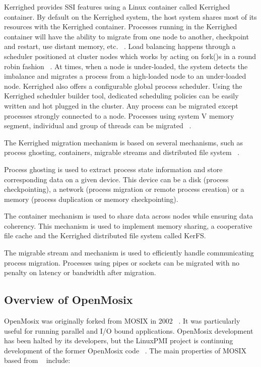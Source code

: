 \documentclass[preprint]{acm_proc_article-sp}
\begin{document}
Kerrighed provides SSI features using a Linux container called Kerrighed container. By default on the Kerrighed system, the host system shares most of its resources with the Kerrighed container. Processes running in the Kerrighed container will have the ability to migrate from one node to another, checkpoint and restart, use distant memory, etc. ~\citep{kerrighed12}. Load balancing happens through a scheduler positioned at cluster nodes which works by acting on fork()s in a round robin fashion ~\citep{kerrighed12}. At times, when a node is under-loaded, the system detects the imbalance and migrates a process from a high-loaded node to an under-loaded node. Kerrighed also offers a configurable global process scheduler. Using the Kerrighed scheduler builder tool, dedicated scheduling policies can be easily written and hot plugged in the cluster. Any process can be migrated except processes strongly connected to a node. Processes using system V memory segment, individual and group of threads can be migrated ~\citep{lottiaux04}.

The Kerrighed migration mechanism is based on several mechanisms, such as process ghosting, containers, migrable streams and distributed file system ~\citep{lottiaux04}. 

Process ghosting is used to extract process state information and store corresponding data on a given device. This device can be a disk (process checkpointing), a network (process migration or remote process creation) or a memory (process duplication or memory checkpointing). 

The container mechanism is used to share data across nodes while ensuring data coherency. This mechanism is used to implement memory sharing, a cooperative file cache and the Kerrighed distributed file system called KerFS.

The migrable stream and mechanism is used to efficiently handle communicating process migration. Processes using pipes or sockets can be migrated with no penalty on latency or bandwidth after migration.

\subsection{Overview of OpenMosix}
	
OpenMosix was originally forked from MOSIX in 2002 ~\citep{openmosix12}. It was particularly useful for running parallel and I/O bound applications. OpenMosix development has been halted by its developers, but the LinuxPMI project is continuing development of the former OpenMosix code ~\citep{openmosix12}. The main properties of MOSIX based from ~\citep{barak95} include:
\end{document}
